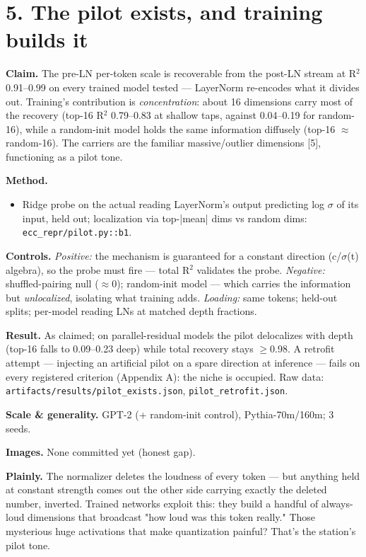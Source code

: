 \documentclass[10pt]{article}
\begin{document}
\section{5. The pilot exists, and training builds it}

\textbf{Claim.} The pre-LN per-token scale is recoverable from the post-LN stream at R$^{2}$ 0.91--0.99 on
every trained model tested --- LayerNorm re-encodes what it divides out. Training's contribution is
\emph{concentration}: about 16 dimensions carry most of the recovery (top-16 R$^{2}$ 0.79--0.83 at shallow
taps, against 0.04--0.19 for random-16), while a random-init model holds the same information
diffusely (top-16 $\approx$ random-16). The carriers are the familiar massive/outlier dimensions [5],
functioning as a pilot tone.

\textbf{Method.}
\begin{itemize}\setlength\itemsep{1pt}
\item Ridge probe on the actual reading LayerNorm's output predicting log $\sigma$ of its input, held out; localization via top-|mean| dims vs random dims: \texttt{ecc\_repr/pilot.py::b1}.
\end{itemize}
\textbf{Controls.} \emph{Positive:} the mechanism is guaranteed for a constant direction (c/$\sigma$(t) algebra), so
the probe must fire --- total R$^{2}$ validates the probe. \emph{Negative:} shuffled-pairing null ($\approx$0);
random-init model --- which carries the information but \emph{unlocalized}, isolating what training adds.
\emph{Loading:} same tokens; held-out splits; per-model reading LNs at matched depth fractions.

\textbf{Result.} As claimed; on parallel-residual models the pilot delocalizes with depth (top-16 falls
to 0.09--0.23 deep) while total recovery stays $\ge$0.98. A retrofit attempt --- injecting an artificial
pilot on a spare direction at inference --- fails on every registered criterion (Appendix A): the
niche is occupied. Raw data: \texttt{artifacts/results/pilot\_exists.json}, \texttt{pilot\_retrofit.json}.

\textbf{Scale \& generality.} GPT-2 (+ random-init control), Pythia-70m/160m; 3 seeds.

\textbf{Images.} None committed yet (honest gap).

\textbf{Plainly.} The normalizer deletes the loudness of every token --- but anything held at constant
strength comes out the other side carrying exactly the deleted number, inverted. Trained networks
exploit this: they build a handful of always-loud dimensions that broadcast "how loud was this
token really." Those mysterious huge activations that make quantization painful? That's the
station's pilot tone.
\end{document}
